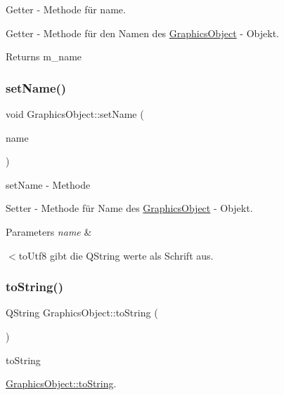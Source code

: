 Getter -\/ Methode für name. 

Getter -\/ Methode für den Namen des \hyperlink{class_graphics_object}{Graphics\+Object} -\/ Objekt.

\begin{DoxyReturn}{Returns}
m\+\_\+name 
\end{DoxyReturn}
\mbox{\label{class_graphics_object_a1b0c7c7f87e86833a9a23ab1a2b6f685}} 
\subsubsection{\texorpdfstring{set\+Name()}{setName()}}
{\footnotesize\ttfamily void Graphics\+Object\+::set\+Name (\begin{DoxyParamCaption}\item[{const Q\+String \&}]{name }\end{DoxyParamCaption})}



set\+Name -\/ Methode 

Setter -\/ Methode für Name des \hyperlink{class_graphics_object}{Graphics\+Object} -\/ Objekt.


\begin{DoxyParams}{Parameters}
{\em name} & \\
\hline
\end{DoxyParams}
$<$to\+Utf8 gibt die Q\+String werte als Schrift aus. \mbox{\label{class_graphics_object_ad985316df1516a5a7311161250b5e233}} 
\subsubsection{\texorpdfstring{to\+String()}{toString()}}
{\footnotesize\ttfamily Q\+String Graphics\+Object\+::to\+String (\begin{DoxyParamCaption}{ }\end{DoxyParamCaption})\hspace{0.3cm}{\ttfamily [virtual]}}



to\+String 

\hyperlink{class_graphics_object_ad985316df1516a5a7311161250b5e233}{Graphics\+Object\+::to\+String}.

